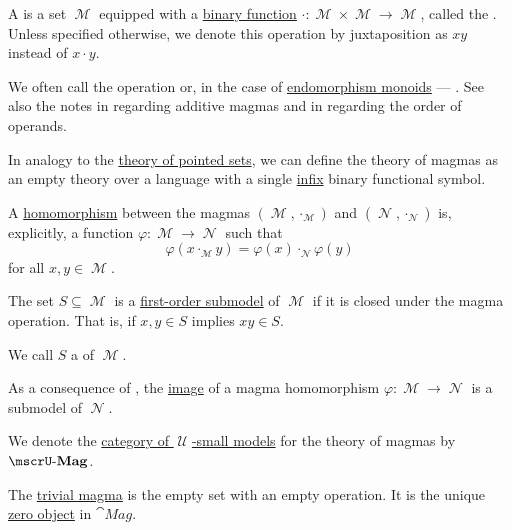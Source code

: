 \begin{definition}\label{def:magma}
  A  is a set \( \mscrM \) equipped with a \hyperref[def:multi_valued_function/arguments]{binary function} \( \cdot: \mscrM \times \mscrM \to \mscrM \), called the . Unless specified otherwise, we denote this operation by juxtaposition as \( xy \) instead of \( x \cdot y \).

  We often call the operation  or, in the case of \hyperref[def:endomorphism_monoid]{endomorphism monoids} --- . See also the notes in  regarding additive magmas and in  regarding the order of operands.

  \begin{thmenum}[series=def:magma]
     In analogy to the \hyperref[def:pointed_set/theory]{theory of pointed sets}, we can define the theory of magmas as an empty theory over a language with a single \hyperref[rem:first_order_formula_conventions/infix]{infix} binary functional symbol.

     A \hyperref[def:first_order_homomorphism]{homomorphism} between the magmas \( (\mscrM, \cdot_{\mscrM}) \) and \( (\mscrN, \cdot_{\mscrN}) \) is, explicitly, a function \( \varphi: \mscrM \to \mscrN \) such that
    \begin{equation}\label{eq:def:magma/homomorphism}
      \varphi(x \cdot_{\mscrM} y) = \varphi(x) \cdot_{\mscrN} \varphi(y)
    \end{equation}
    for all \( x, y \in \mscrM \).

     The set \( S \subseteq \mscrM \) is a \hyperref[def:first_order_substructure]{first-order submodel} of \( \mscrM \) if it is closed under the magma operation. That is, if \( x, y \in S \) implies \( xy \in S \).

    We call \( S \) a  of \( \mscrM \).

    As a consequence of , the \hyperref[def:multi_valued_function/image]{image} of a magma homomorphism \( \varphi: \mscrM \to \mscrN \) is a submodel of \( \mscrN \).

     We denote the \hyperref[def:category_of_small_first_order_models]{category of \( \mscrU \)-small models} for the theory of magmas by \( \ucat{Mag} \).

     The \hyperref[thm:substructures_form_complete_lattice/bottom]{trivial magma} is the empty set with an empty operation. It is the unique \hyperref[def:universal_objects/initial]{zero object} in \( \cat{Mag} \).


\end{thmenum}
\end{definition}
